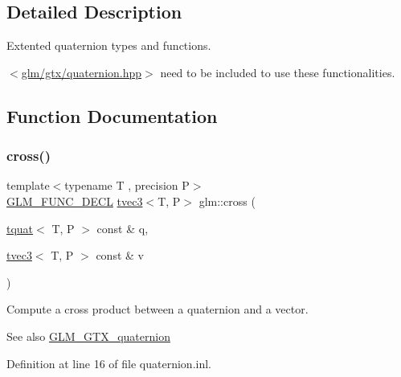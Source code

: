 \subsection{Detailed Description}
Extented quaternion types and functions. 

$<$\mbox{\hyperlink{gtx_2quaternion_8hpp}{glm/gtx/quaternion.\+hpp}}$>$ need to be included to use these functionalities. 

\subsection{Function Documentation}
\mbox{\label{group__gtx__quaternion_ga33ecf8ba903eee5fc09f0fbfc0d5ca6b}} 
\subsubsection{\texorpdfstring{cross()}{cross()}\hspace{0.1cm}{\footnotesize\ttfamily [1/2]}}
{\footnotesize\ttfamily template$<$typename T , precision P$>$ \\
\mbox{\hyperlink{setup_8hpp_ab2d052de21a70539923e9bcbf6e83a51}{G\+L\+M\+\_\+\+F\+U\+N\+C\+\_\+\+D\+E\+CL}} \mbox{\hyperlink{structglm_1_1tvec3}{tvec3}}$<$T, P$>$ glm\+::cross (\begin{DoxyParamCaption}\item[{\mbox{\hyperlink{structglm_1_1tquat}{tquat}}$<$ T, P $>$ const \&}]{q,  }\item[{\mbox{\hyperlink{structglm_1_1tvec3}{tvec3}}$<$ T, P $>$ const \&}]{v }\end{DoxyParamCaption})}

Compute a cross product between a quaternion and a vector.

\begin{DoxySeeAlso}{See also}
\mbox{\hyperlink{group__gtx__quaternion}{G\+L\+M\+\_\+\+G\+T\+X\+\_\+quaternion}} 
\end{DoxySeeAlso}


Definition at line 16 of file quaternion.\+inl.

\mbox{\label{group__gtx__quaternion_ga4bfe3c7770fc43d14b8ef0058c4a86b5}} 
